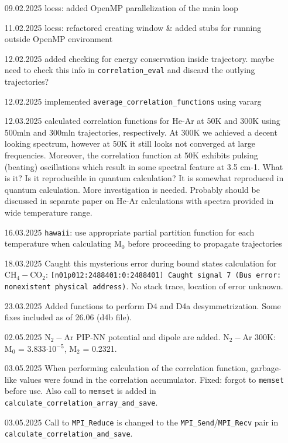 \documentclass[color]{article}
\begin{document}
\begin{enumerate}
    \item [09.02.2025] loess: added OpenMP parallelization of the main loop
    \item [11.02.2025] loess: refactored creating window \& added stubs for running outside OpenMP environment
    \item [12.02.2025] added checking for energy conservation inside trajectory. {\color{red} maybe need to check this info in \texttt{correlation\_eval} and discard the outlying trajectories?}
    \item [12.02.2025] implemented \texttt{average\_correlation\_functions} using vararg
    \item [12.03.2025] calculated correlation functions for He-Ar at 50K and 300K using 500mln and 300mln trajectories, respectively. At 300K we achieved a decent looking spectrum, however at 50K it still looks not converged at large frequencies. Moreover, the correlation function at 50K exhibits pulsing (beating) oscillations which result in some spectral feature at 3.5 cm-1. What is it? Is it reproducible in quantum calculation? {\color{red} It is somewhat reproduced in quantum calculation. More investigation is needed. Probably should be discussed in separate paper on He-Ar calculations with spectra provided in wide temperature range.}
    \item [16.03.2025] \texttt{hawaii}: use appropriate partial partition function for each temperature when calculating M$_0$ before proceeding to propagate trajectories
    \item [18.03.2025] Caught this mysterious error during bound states calculation for CH$_4-$CO$_2$: \texttt{[n01p012:2488401:0:2488401] Caught signal 7 (Bus error: nonexistent physical address)}. No stack trace, location of error unknown.
    \item [23.03.2025] Added functions to perform D4 and D4a desymmetrization. Some fixes included as of 26.06 (d4b file).
    \item [02.05.2025] N$_2-$Ar PIP-NN potential and dipole are added. N$_2-$Ar 300K: M$_0$ = 3.833$\cdot$10$^{-5}$, M$_2$ = 0.2321.
    \item [03.05.2025] When performing calculation of the correlation function, garbage-like values were found in the correlation accumulator. Fixed: forgot to \texttt{memset} before use. Also call to \texttt{memset} is added in \texttt{calculate\_correlation\_array\_and\_save}.
    \item [03.05.2025] Call to \texttt{MPI\_Reduce} is changed to the \texttt{MPI\_Send}/\texttt{MPI\_Recv} pair in \texttt{calculate\_correlation\_and\_save}.

\end{enumerate}
\end{document}
